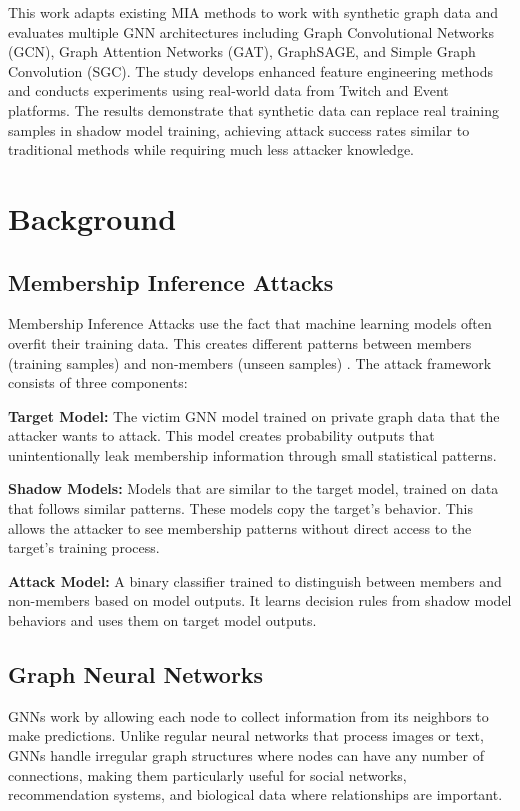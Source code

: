 \documentclass{article}
\begin{document}
This work adapts existing MIA methods to work with synthetic graph data and evaluates multiple GNN architectures including Graph Convolutional Networks (GCN), Graph Attention Networks (GAT), GraphSAGE, and Simple Graph Convolution (SGC). The study develops enhanced feature engineering methods and conducts experiments using real-world data from Twitch and Event platforms. The results demonstrate that synthetic data can replace real training samples in shadow model training, achieving attack success rates similar to traditional methods while requiring much less attacker knowledge.

\section{Background}
\subsection{Membership Inference Attacks}
Membership Inference Attacks use the fact that machine learning models often overfit their training data. This creates different patterns between members (training samples) and non-members (unseen samples) \cite{salem2019ml, nasr2019comprehensive}. The attack framework consists of three components:

\textbf{Target Model:} The victim GNN model trained on private graph data that the attacker wants to attack. This model creates probability outputs that unintentionally leak membership information through small statistical patterns.

\textbf{Shadow Models:} Models that are similar to the target model, trained on data that follows similar patterns. These models copy the target's behavior. This allows the attacker to see membership patterns without direct access to the target's training process.

\textbf{Attack Model:} A binary classifier trained to distinguish between members and non-members based on model outputs. It learns decision rules from shadow model behaviors and uses them on target model outputs.

\subsection{Graph Neural Networks}
GNNs work by allowing each node to collect information from its neighbors to make predictions. Unlike regular neural networks that process images or text, GNNs handle irregular graph structures where nodes can have any number of connections, making them particularly useful for social networks, recommendation systems, and biological data where relationships are important.
\end{document}
